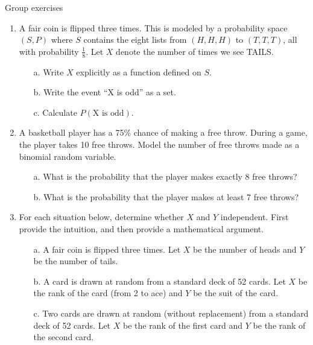 \documentclass[10pt]{beamer}
\begin{document}
\begin{frame}{Group exercises}

\begin{enumerate}
	\item \small  A fair coin is flipped three times. This is modeled by a probability space $(S,P)$ where $S$ contains the eight lists from $(H,H,H)$ to $(T,T,T)$, all with probability $\frac{1}{8}$.  Let $X$ denote the number of times we see TAILS.
	\begin{itemize} \footnotesize 
	\item[a.] Write $X$ explicitly as a function defined on $S$.
	\item[b.] Write the event \enquote{X is odd} as a set.
	\item[c.] Calculate $P(\text{X is odd})$.
	\end{itemize}
	\item \small  
	A basketball player has a 75\% chance of making a free throw. During a game, the player takes 10 free throws. Model the number of free throws made as a binomial random variable. 
		\begin{itemize}\footnotesize  
		\item[a.] What is the probability that the player makes exactly 8 free throws?
		\item[b.] What is the probability that the player makes at least 7 free throws?
		\end{itemize}
	\item  \small  For each situation below, determine whether $X$ and $Y$ independent. First provide the intuition, and then provide a mathematical argument. 
	\begin{itemize} \footnotesize
	\item[a.] A fair coin is flipped three times. Let $X$ be the number of heads and $Y$ be the number of tails. 
	\item[b.] A card is drawn at random from a standard deck of 52 cards. Let $X$ be the rank of the card (from 2 to ace) and $Y$ be the suit of the card.
	\item[c.] Two cards are drawn at random (without replacement) from a standard deck of 52 cards. Let $X$ be the rank of the first card and $Y$ be the rank of the second card.
	\end{itemize} 
\end{enumerate}

\end{frame}
\end{document}
